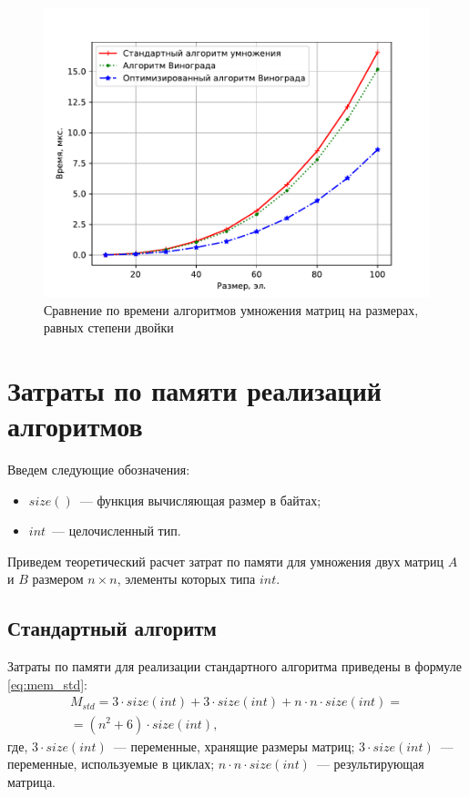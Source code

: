 \begin{figure}[H]
	\centering
	\includegraphics[height=0.4\textheight, page=3]{img/figures.pdf}
	\caption{Сравнение по времени алгоритмов умножения матриц на размерах, равных степени двойки}
	\label{plt:time_03}
\end{figure}

\section{Затраты по памяти реализаций алгоритмов}
Введем следующие обозначения:
\begin{itemize}
	\item $size()$~--- функция вычисляющая размер в байтах;
	\item $int$~--- целочисленный тип.
\end{itemize}

Приведем теоретический расчет затрат по памяти для умножения двух матриц $A$ и $B$ размером $n \times n$, элементы которых типа $int$.

\subsection*{Стандартный алгоритм}
Затраты по памяти для реализации стандартного алгоритма приведены в формуле \ref{eq:mem_std}:
\begin{equation}
	\label{eq:mem_std}
	\begin{gathered}
		M_{std} = 3 \cdot size(int) + 3 \cdot size(int) + n \cdot n \cdot size(int) = \\ = (n^{2} + 6) \cdot size(int),
	\end{gathered}
\end{equation}
где, $3 \cdot size(int)$~--- переменные, хранящие размеры матриц;
\newline $3 \cdot size(int)$~--- переменные, используемые в циклах;
\newline $n \cdot n \cdot size(int)$~--- результирующая матрица.

